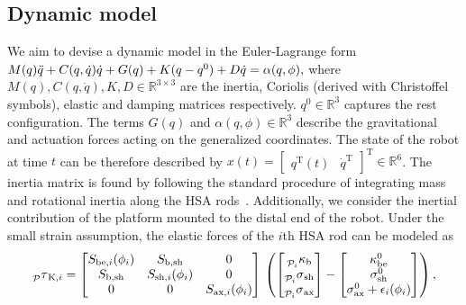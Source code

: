 \subsection{Dynamic model}\label{sub:hsacontrol:methodology:dynamics}
We aim to devise a dynamic model in the Euler-Lagrange form
$M(q) \Ddot{q} + C(q,\dot{q})\dot{q} + G(q) + K (q - q^0) + D \dot{q} = \alpha(q,\phi),$
where $M(q),C(q,\dot{q}),K,D \in \mathbb{R}^{3 \times 3}$ are the inertia, Coriolis (derived with Christoffel symbols), elastic and damping matrices respectively. $q^0 \in \mathbb{R}^3$ captures the rest configuration. The terms $G(q)$ and $\alpha(q,\phi) \in \mathbb{R}^3$ describe the gravitational and actuation forces acting on the generalized coordinates.
The state of the robot at time $t$ can be therefore described by $x(t) = \begin{bmatrix}
    q^\mathrm{T}(t) & \dot{q}^\mathrm{T}
\end{bmatrix}^\mathrm{T} \in \mathbb{R}^6$.
The inertia matrix is found by following the standard procedure of integrating mass and rotational inertia along the \gls{HSA} rods~\cite{della2023model}. Additionally, we consider the inertial contribution of the platform mounted to the distal end of the robot.
Under the small strain assumption, the elastic forces of the $i$th \gls{HSA} rod can be modeled as
\begin{equation}
    \prescript{}{\mathcal{P}}{\tau}_{\mathrm{K},i} = 
    \begin{bmatrix}
        S_{\mathrm{be},i}(\phi_i) & S_{\mathrm{b},\mathrm{sh}} & 0\\
        S_{\mathrm{b},\mathrm{sh}} & S_{\mathrm{sh},i}(\phi_i) & 0\\
        0 & 0 & S_{\mathrm{ax},i}(\phi_i)
    \end{bmatrix} 
    \, \left ( \begin{bmatrix}
        \prescript{}{\mathcal{P}_i}{\kappa}_\mathrm{b}\\ \prescript{}{\mathcal{P}_i}{\sigma}_\mathrm{sh}\\ \prescript{}{\mathcal{P}_i}{\sigma}_\mathrm{ax}
    \end{bmatrix} - \begin{bmatrix}
        \kappa_\mathrm{be}^0\\ \sigma_\mathrm{sh}^0\\ \sigma_\mathrm{ax}^0 + \epsilon_i (\phi_i)
    \end{bmatrix} \right ),
\end{equation}
